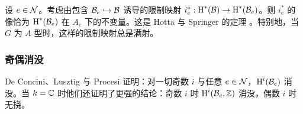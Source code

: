 \subsubsection{} 设 $e\in\mathcal{N}$。考虑由包含 $\mathcal{B}_{e}\hookrightarrow\mathcal{B}$ 诱导的限制映射 $i^{*}_{e}: \textup{H}^{*}({\mathcal{B}})\to \textup{H}^{*}({\mathcal{B}_{e}})$。则 $i^{*}_{e}$ 的像恰为 $\textup{H}^{*}({\mathcal{B}_{e}})$ 在 $A_{e}$ 下的不变量。这是 Hotta 与 Springer 的定理 \cite[Theorem 1.1]{HottaSpringer}。特别地，当 $G$ 为 $A$ 型时，这样的限制映射总是满射。

\subsubsection{奇偶消没} De Concini、Lusztig 与 Procesi \cite{DLP} 证明：对一切奇数 $i$ 与任意 $e\in\mathcal{N}$，$\textup{H}^{i}({\mathcal{B}_{e}})$ 消没。当 $k=\mathbb{C}$ 时他们还证明了更强的结论：奇数 $i$ 时 $\textup{H}^{i}({\mathcal{B}_{e},\mathbb{Z}})$ 消没，偶数 $i$ 时无挠。
